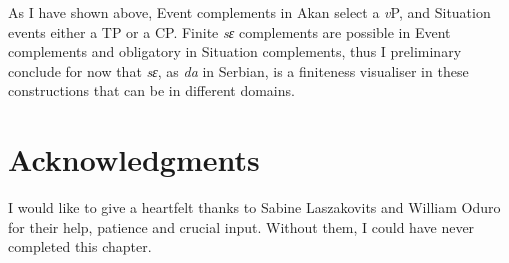 \documentclass[output=paper]{langscibook}
\begin{document}
As I have shown above, Event complements in Akan select a \emph{v}P, and Situation events either a TP or a CP. Finite \emph{sɛ} complements are possible in Event complements and obligatory in Situation complements, thus I preliminary conclude for now that \emph{sɛ}, as \emph{da} in Serbian, is a finiteness visualiser in these constructions that can be in different domains. 


\section*{Acknowledgments}
I would like to give a heartfelt thanks to Sabine Laszakovits and William Oduro for their help, patience and crucial input. Without them, I could have never completed this chapter.

{\sloppy\printbibliography[heading=subbibliography,notkeyword=this]}
\end{document}
